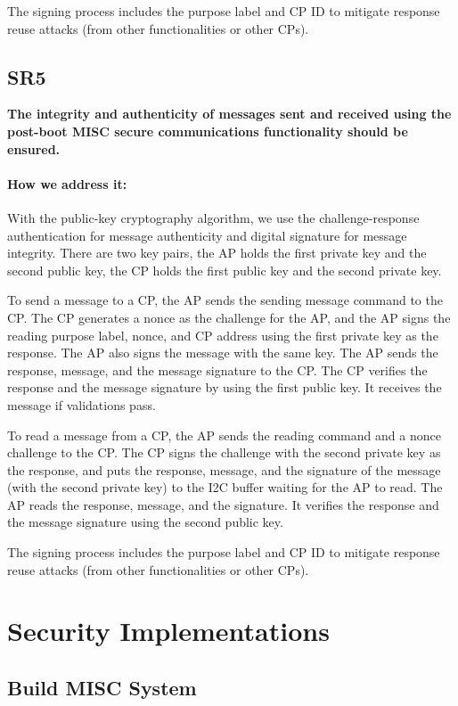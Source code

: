 \documentclass[11pt,oneside,onecolumn,letterpaper]{article}
\newcounter{alg}
\begin{document}
	The signing process includes the purpose label and CP ID to mitigate response reuse attacks (from other functionalities or other CPs).
	
	\subsection{SR5}
	\textbf{The integrity and authenticity of messages sent and received using the post-boot MISC secure communications functionality should be ensured.}
	\paragraph{How we address it:}
	With the public-key cryptography algorithm,
	we use the challenge-response authentication for message authenticity and digital signature for message integrity.
	There are two key pairs,
	the AP holds the first private key and the second public key,
	the CP holds the first public key and the second private key.
	
	To send a message to a CP,
	the AP sends the sending message command to the CP.
	The CP generates a nonce as the challenge for the AP,
	and the AP signs the reading purpose label,
	nonce,
	and CP address using the first private key as the response.
	The AP also signs the message with the same key.
	The AP sends the response,
	message,
	and the message signature to the CP.
	The CP verifies the response and the message signature by using the first public key.
	It receives the message if validations pass.
	
	To read a message from a CP,
	the AP sends the reading command and a nonce challenge to the CP.
	The CP signs the challenge with the second private key as the response,
	and puts the response,
	message,
	and the signature of the message (with the second private key) to the I2C buffer waiting for the AP to read.
	The AP reads the response,
	message,
	and the signature.
	It verifies the response and the message signature using the second public key.
	
	The signing process includes the purpose label and CP ID to mitigate response reuse attacks (from other functionalities or other CPs).
	
	
	\section{Security Implementations}
	
	
	\subsection{Build MISC System}
\end{document}
